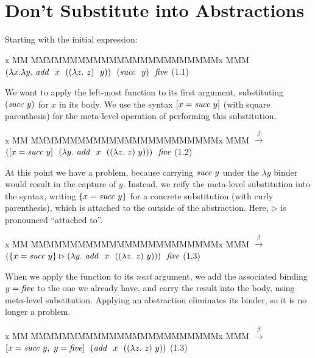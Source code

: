 
\clearpage{}
\section{Don't Substitute into Abstractions}
Starting with the initial expression:
%
\begin{tabbing}
x \= MM \= MMMMMMMMMMMMMMMMMMMMMMMMx \= MMM \kill
        \> 
        \> $(\lambda x. \lambda y.~ 
                \mathit{add}~~ x~~ ((\lambda z.~ z)~~ y))~~ (\mathit{succ}~~ y)~~ \mathit{five}$ 
        \>  (1.1)
\end{tabbing}

We want to apply the left-most function to its first argument, substituting $(\mathit{succ}~ y)$ for $x$ in its body. We use the syntax \mbox{$[x = \mathit{succ}~ y]$} (with square parenthesis) for the meta-level operation of performing this substitution.
%
\begin{tabbing}
x \= MM \= MMMMMMMMMMMMMMMMMMMMMMMMx \= MMM \kill
        \> $\stackrel{\beta}{\longrightarrow}$
        \> $([x = \mathit{succ}~ y]~~ (\lambda y.~ 
                \mathit{add}~~ x~~ ((\lambda z.~ z)~ y)))~~ \mathit{five}$
        \> (1.2)
\end{tabbing}

At this point we have a problem, because carrying $\mathit{succ}~ y$ under the $\lambda y$ binder would result in the capture of $y$. Instead, we reify the meta-level substitution into the syntax, writing $\{ x = \mathit{succ}~ y \}$ for a concrete substitution (with curly parenthesis), which is attached to the outside of the abstraction. Here, $\rhd$ is pronounced ``attached to''.
%
\begin{tabbing}
x \= MM \= MMMMMMMMMMMMMMMMMMMMMMMMx \= MMM \kill
        \> $\stackrel{\beta}{\longrightarrow}$
        \> $(\{x = \mathit{succ}~ y\} 
                \rhd (\lambda y.~ \mathit{add}~~ x~~ ((\lambda z.~ z)~ y)))~~ \mathit{five}$
        \> (1.3)
\end{tabbing}

When we apply the function to its \emph{next} argument, we add the associated binding $y = \mathit{five}$ to the one we already have, and carry the result into the body, using meta-level substitution. Applying an abstraction eliminates its binder, so it is no longer a problem.
%
\begin{tabbing}
x \= MM \= MMMMMMMMMMMMMMMMMMMMMMMMx \= MMM \kill
        \> $\stackrel{\beta}{\longrightarrow}$
        \> $[x = \mathit{succ}~ y,~ y = \mathit{five}]~~ 
                (\mathit{add}~~ x~~ ((\lambda z.~ z)~ y))$
        \> (1.3)
\end{tabbing}

